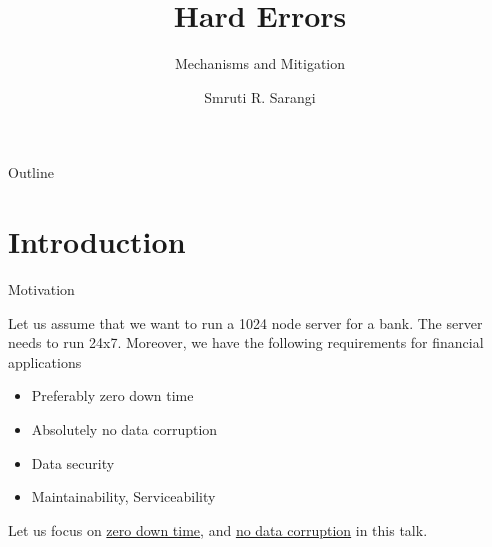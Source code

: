 \documentclass[xcolor=pdftex,dvipsnames,table,svgnames,x11names]{beamer}
\title %
{Hard Errors}
\subtitle
{Mechanisms and Mitigation} %
\author %
{Smruti R. Sarangi}
\institute[Universities of Somewhere and Elsewhere] %
{
  Department of Computer Science\\
  Indian Institute of Technology \\
  New Delhi, India 
}
\date{}
\begin{document}
\begin{frame}
  \titlepage
\end{frame}

\begin{frame}{Outline}
  \tableofcontents
\end{frame}




\section{Introduction}

\begin{frame} {Motivation}
 \begin{example}
    Let us assume that we want to run a 1024 node server for a bank. The server needs to run 24x7. 
    Moreover, we have the following requirements for financial applications
      \begin{itemize}
       \item Preferably zero down time
       \item \alert{Absolutely no data corruption}
       \item Data security
       \item Maintainability, Serviceability
      \end{itemize}
 \end{example}

\begin{block} {}
  Let us focus on \underline{zero down time}, and \underline{no data corruption} in this talk.  
\end{block}

\end{frame}
\end{document}
